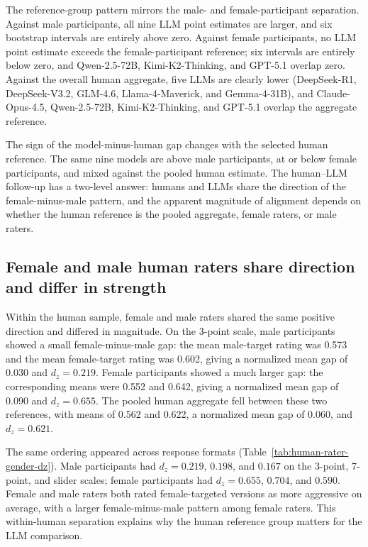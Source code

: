 \documentclass[a4paper,fleqn,review,longmktitle]{cas-sc}
\begin{document}
The reference-group pattern mirrors the male- and female-participant separation. Against male participants, all nine LLM point estimates are larger, and six bootstrap intervals are entirely above zero. Against female participants, no LLM point estimate exceeds the female-participant reference; six intervals are entirely below zero, and Qwen-2.5-72B, Kimi-K2-Thinking, and GPT-5.1 overlap zero. Against the overall human aggregate, five LLMs are clearly lower (DeepSeek-R1, DeepSeek-V3.2, GLM-4.6, Llama-4-Maverick, and Gemma-4-31B), and Claude-Opus-4.5, Qwen-2.5-72B, Kimi-K2-Thinking, and GPT-5.1 overlap the aggregate reference.

The sign of the model-minus-human gap changes with the selected human reference. The same nine models are above male participants, at or below female participants, and mixed against the pooled human estimate. The human--LLM follow-up has a two-level answer: humans and LLMs share the direction of the female-minus-male pattern, and the apparent magnitude of alignment depends on whether the human reference is the pooled aggregate, female raters, or male raters.

\subsection{Female and male human raters share direction and differ in strength}
\label{sec:result-rq1c}

Within the human sample, female and male raters shared the same positive direction and differed in magnitude. On the 3-point scale, male participants showed a small female-minus-male gap: the mean male-target rating was 0.573 and the mean female-target rating was 0.602, giving a normalized mean gap of 0.030 and $d_z = 0.219$. Female participants showed a much larger gap: the corresponding means were 0.552 and 0.642, giving a normalized mean gap of 0.090 and $d_z = 0.655$. The pooled human aggregate fell between these two references, with means of 0.562 and 0.622, a normalized mean gap of 0.060, and $d_z = 0.621$.

The same ordering appeared across response formats (Table~\ref{tab:human-rater-gender-dz}). Male participants had $d_z = 0.219$, $0.198$, and $0.167$ on the 3-point, 7-point, and slider scales; female participants had $d_z = 0.655$, $0.704$, and $0.590$. Female and male raters both rated female-targeted versions as more aggressive on average, with a larger female-minus-male pattern among female raters. This within-human separation explains why the human reference group matters for the LLM comparison.
\end{document}
